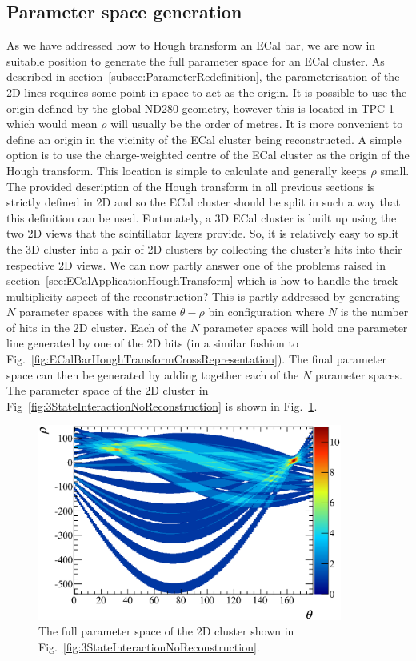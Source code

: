 \subsection{Parameter space generation}
\label{subsec:ParameterSpaceGeneration}
As we have addressed how to Hough transform an ECal bar, we are now in suitable position to generate the full parameter space for an ECal cluster.  As described in section~\ref{subsec:ParameterRedefinition}, the parameterisation of the 2D lines requires some point in space to act as the origin.  It is possible to use the origin defined by the global ND280 geometry, however this is located in TPC 1 which would mean $\rho$ will usually be the order of metres.  It is more convenient to define an origin in the vicinity of the ECal cluster being reconstructed.  A simple option is to use the charge-weighted centre of the ECal cluster as the origin of the Hough transform.  This location is simple to calculate and generally keeps $\rho$ small.
\newline
The provided description of the Hough transform in all previous sections is strictly defined in 2D and so the ECal cluster should be split in such a way that this definition can be used.  Fortunately, a 3D ECal cluster is built up using the two 2D views that the scintillator layers provide.  So, it is relatively easy to split the 3D cluster into a pair of 2D clusters by collecting the cluster's hits into their respective 2D views.
\newline
We can now partly answer one of the problems raised in section~\ref{sec:ECalApplicationHoughTransform} which is how to handle the track multiplicity aspect of the reconstruction?  This is partly addressed by generating $N$ parameter spaces with the same $\theta-\rho$ bin configuration where $N$ is the number of hits in the 2D cluster.  Each of the $N$ parameter spaces will hold one parameter line generated by one of the 2D hits (in a similar fashion to Fig.~\ref{fig:ECalBarHoughTransformCrossRepresentation}).  The final parameter space can then be generated by adding together each of the $N$ parameter spaces.  The parameter space of the 2D cluster in Fig~\ref{fig:3StateInteractionNoReconstruction} is shown in Fig.~\ref{fig:FullParameterSpace3StateInteraction}.
\begin{figure}
  \centering
  \includegraphics[width=10cm]{images/ecal_hough_transform/FullParameterSpace_3StateInteraction.eps}
  \caption{The full parameter space of the 2D cluster shown in Fig.~\ref{fig:3StateInteractionNoReconstruction}.}
  \label{fig:FullParameterSpace3StateInteraction}
\end{figure}



